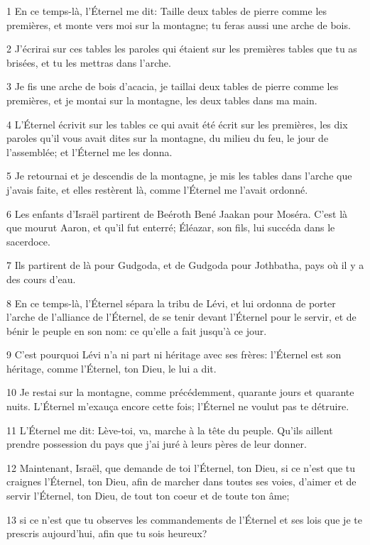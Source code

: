 \par 1 En ce temps-là, l'Éternel me dit: Taille deux tables de pierre comme les premières, et monte vers moi sur la montagne; tu feras aussi une arche de bois.
\par 2 J'écrirai sur ces tables les paroles qui étaient sur les premières tables que tu as brisées, et tu les mettras dans l'arche.
\par 3 Je fis une arche de bois d'acacia, je taillai deux tables de pierre comme les premières, et je montai sur la montagne, les deux tables dans ma main.
\par 4 L'Éternel écrivit sur les tables ce qui avait été écrit sur les premières, les dix paroles qu'il vous avait dites sur la montagne, du milieu du feu, le jour de l'assemblée; et l'Éternel me les donna.
\par 5 Je retournai et je descendis de la montagne, je mis les tables dans l'arche que j'avais faite, et elles restèrent là, comme l'Éternel me l'avait ordonné.
\par 6 Les enfants d'Israël partirent de Beéroth Bené Jaakan pour Moséra. C'est là que mourut Aaron, et qu'il fut enterré; Éléazar, son fils, lui succéda dans le sacerdoce.
\par 7 Ils partirent de là pour Gudgoda, et de Gudgoda pour Jothbatha, pays où il y a des cours d'eau.
\par 8 En ce temps-là, l'Éternel sépara la tribu de Lévi, et lui ordonna de porter l'arche de l'alliance de l'Éternel, de se tenir devant l'Éternel pour le servir, et de bénir le peuple en son nom: ce qu'elle a fait jusqu'à ce jour.
\par 9 C'est pourquoi Lévi n'a ni part ni héritage avec ses frères: l'Éternel est son héritage, comme l'Éternel, ton Dieu, le lui a dit.
\par 10 Je restai sur la montagne, comme précédemment, quarante jours et quarante nuits. L'Éternel m'exauça encore cette fois; l'Éternel ne voulut pas te détruire.
\par 11 L'Éternel me dit: Lève-toi, va, marche à la tête du peuple. Qu'ils aillent prendre possession du pays que j'ai juré à leurs pères de leur donner.
\par 12 Maintenant, Israël, que demande de toi l'Éternel, ton Dieu, si ce n'est que tu craignes l'Éternel, ton Dieu, afin de marcher dans toutes ses voies, d'aimer et de servir l'Éternel, ton Dieu, de tout ton coeur et de toute ton âme;
\par 13 si ce n'est que tu observes les commandements de l'Éternel et ses lois que je te prescris aujourd'hui, afin que tu sois heureux?
